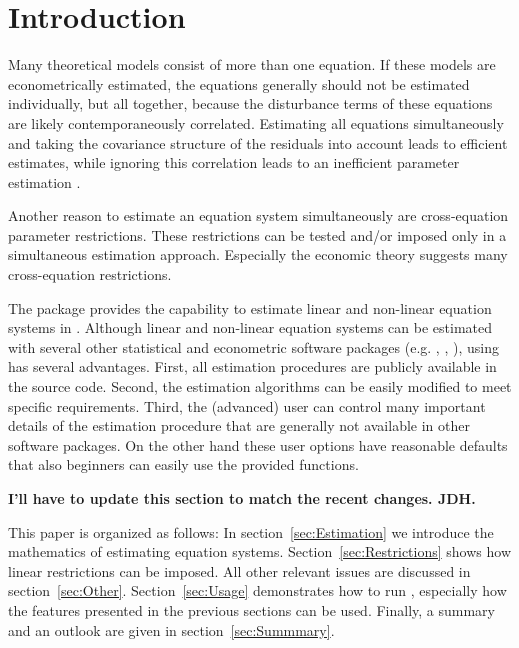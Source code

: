 \section{Introduction}

Many theoretical models consist of more than one equation. If these
models are econometrically estimated, the equations generally should
not be estimated individually, but all together, because the
disturbance terms of these equations are likely contemporaneously
correlated. Estimating all equations simultaneously and taking the
covariance structure of the residuals into account leads to efficient
estimates, while ignoring this correlation leads to an inefficient
parameter estimation \citep{zellner62}.

Another reason to estimate an equation system simultaneously are
cross-equation parameter restrictions. These restrictions can be
tested and/or imposed only in a simultaneous estimation
approach. Especially the economic theory suggests many cross-equation
restrictions.

The  package provides the capability to estimate
linear and non-linear equation systems in .
Although linear and non-linear equation systems can be estimated
with several other statistical and econometric software packages
(e.g. , , ),
using  has several advantages.
First, all estimation procedures are publicly available in the source code.
Second, the estimation algorithms can be easily modified to meet specific
requirements.
Third, the (advanced) user can control many important details of the
estimation procedure that are generally not available in other software
packages.
On the other hand these user options have reasonable defaults that also
beginners can easily use the provided functions.

\textbf{I'll have to update this section to match the recent changes. JDH.}

This paper is organized as follows: In section~\ref{sec:Estimation} we
introduce the mathematics of estimating equation systems.
Section~\ref{sec:Restrictions} shows how linear restrictions can be
imposed.
All other relevant issues are discussed in section~\ref{sec:Other}.
Section~\ref{sec:Usage} demonstrates how to run
, especially how the features presented in the previous
sections can be used.
Finally, a summary and an outlook are given in
section~\ref{sec:Summmary}.

